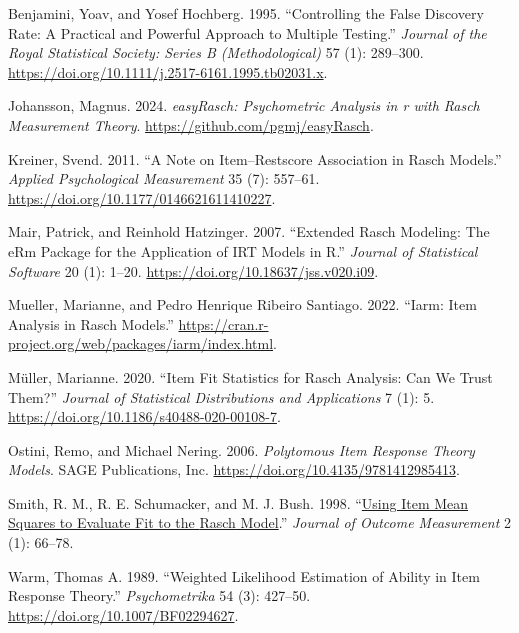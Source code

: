 \documentclass[
  letterpaper,
  DIV=11,
  numbers=noendperiod]{scrartcl}
\newlength{\cslhangindent}
\newenvironment{CSLReferences}[2] %
 {\begin{list}{}{%
  \setlength{\itemindent}{0pt}
  \setlength{\leftmargin}{0pt}
  \setlength{\parsep}{0pt}
  \ifodd #1
   \setlength{\leftmargin}{\cslhangindent}
   \setlength{\itemindent}{-1\cslhangindent}
  \fi
  \setlength{\itemsep}{#2\baselineskip}}}
 {\end{list}}
\begin{document}
\begin{CSLReferences}{1}{0}
Benjamini, Yoav, and Yosef Hochberg. 1995. {``Controlling the {False}
{Discovery} {Rate}: {A} {Practical} and {Powerful} {Approach} to
{Multiple} {Testing}.''} \emph{Journal of the Royal Statistical Society:
Series B (Methodological)} 57 (1): 289--300.
\url{https://doi.org/10.1111/j.2517-6161.1995.tb02031.x}.

Johansson, Magnus. 2024. \emph{easyRasch: Psychometric Analysis in r
with Rasch Measurement Theory}. \url{https://github.com/pgmj/easyRasch}.

Kreiner, Svend. 2011. {``A {Note} on {Item}--{Restscore} {Association}
in {Rasch} {Models}.''} \emph{Applied Psychological Measurement} 35 (7):
557--61. \url{https://doi.org/10.1177/0146621611410227}.

Mair, Patrick, and Reinhold Hatzinger. 2007. {``Extended {Rasch}
{Modeling}: {The} {eRm} {Package} for the {Application} of {IRT}
{Models} in {R}.''} \emph{Journal of Statistical Software} 20 (1):
1--20. \url{https://doi.org/10.18637/jss.v020.i09}.

Mueller, Marianne, and Pedro Henrique Ribeiro Santiago. 2022. {``Iarm:
{Item} {Analysis} in {Rasch} {Models}.''}
\url{https://cran.r-project.org/web/packages/iarm/index.html}.

Müller, Marianne. 2020. {``Item Fit Statistics for {Rasch} Analysis: Can
We Trust Them?''} \emph{Journal of Statistical Distributions and
Applications} 7 (1): 5.
\url{https://doi.org/10.1186/s40488-020-00108-7}.

Ostini, Remo, and Michael Nering. 2006. \emph{Polytomous {Item}
{Response} {Theory} {Models}}. SAGE Publications, Inc.
\url{https://doi.org/10.4135/9781412985413}.

Smith, R. M., R. E. Schumacker, and M. J. Bush. 1998.
{``\href{https://www.ncbi.nlm.nih.gov/pubmed/9661732}{Using Item Mean
Squares to Evaluate Fit to the {Rasch} Model}.''} \emph{Journal of
Outcome Measurement} 2 (1): 66--78.

Warm, Thomas A. 1989. {``Weighted Likelihood Estimation of Ability in
Item Response Theory.''} \emph{Psychometrika} 54 (3): 427--50.
\url{https://doi.org/10.1007/BF02294627}.

\end{CSLReferences}
\end{document}
